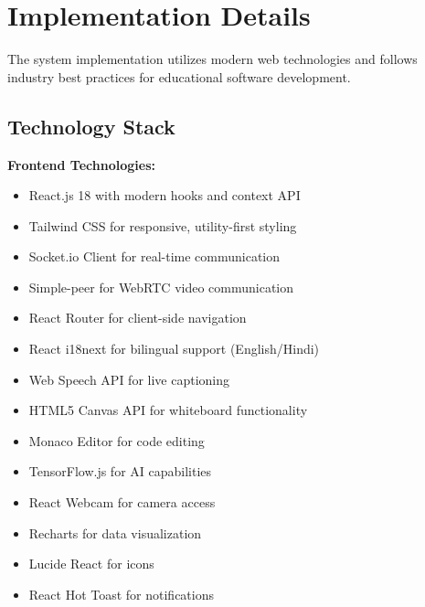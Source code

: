 \documentclass[onecolumn]{IEEEtran}
\begin{document}
\section{Implementation Details}

The system implementation utilizes modern web technologies and follows industry best practices for educational software development.

\subsection{Technology Stack}

\textbf{Frontend Technologies:}
\begin{itemize}
\item React.js 18 with modern hooks and context API
\item Tailwind CSS for responsive, utility-first styling
\item Socket.io Client for real-time communication
\item Simple-peer for WebRTC video communication
\item React Router for client-side navigation
\item React i18next for bilingual support (English/Hindi)
\item Web Speech API for live captioning
\item HTML5 Canvas API for whiteboard functionality
\item Monaco Editor for code editing
\item TensorFlow.js for AI capabilities
\item React Webcam for camera access
\item Recharts for data visualization
\item Lucide React for icons
\item React Hot Toast for notifications
\end{itemize}
\end{document}
